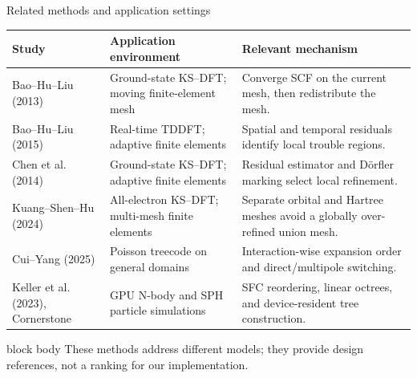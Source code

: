 \documentclass[aspectratio=169,11pt]{beamer}
\begin{document}
\begin{frame}{Related methods and application settings}
  \centering
  \scriptsize
  \renewcommand{\arraystretch}{1.18}
  \setlength{\tabcolsep}{4pt}
  \begin{tabularx}{0.98\textwidth}{
      >{\raggedright\arraybackslash}p{2.75cm}
      >{\raggedright\arraybackslash}p{3.65cm}
      >{\raggedright\arraybackslash}X}
    \toprule
    Study & Application environment & Relevant mechanism\\
    \midrule
    Bao--Hu--Liu (2013)
      & Ground-state KS--DFT; moving finite-element mesh
      & Converge SCF on the current mesh, then redistribute the mesh.\\
    Bao--Hu--Liu (2015)
      & Real-time TDDFT; adaptive finite elements
      & Spatial and temporal residuals identify local trouble regions.\\
    Chen et al. (2014)
      & Ground-state KS--DFT; adaptive finite elements
      & Residual estimator and Dörfler marking select local refinement.\\
    Kuang--Shen--Hu (2024)
      & All-electron KS--DFT; multi-mesh finite elements
      & Separate orbital and Hartree meshes avoid a globally over-refined union mesh.\\
    Cui--Yang (2025)
      & Poisson treecode on general domains
      & Interaction-wise expansion order and direct/multipole switching.\\
    Keller et al. (2023), Cornerstone
      & GPU N-body and SPH particle simulations
      & SFC reordering, linear octrees, and device-resident tree construction.\\
    \bottomrule
  \end{tabularx}

  \vspace{0.22cm}
  \begin{beamercolorbox}[rounded=true,sep=0.3em,wd=0.94\textwidth]{block body}
    \centering\footnotesize
    These methods address different models; they provide design references,
    not a ranking for our implementation.
  \end{beamercolorbox}
\end{frame}
\end{document}
